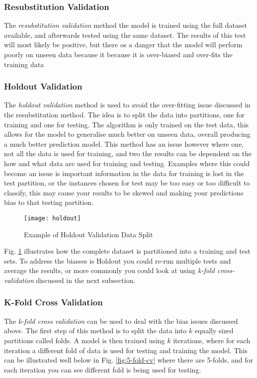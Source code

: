 \subsubsection{Resubstitution Validation}
The \textit{resubstitution validation} method the model is trained using the full dataset available, and afterwards tested using the same dataset. The results of this test will most likely be positive, but there os a danger that the model will perform poorly on unseen data because it because it is over-biased and over-fits the training data

\subsubsection{Holdout Validation}
The \textit{holdout validation} method is used to avoid the over-fitting issue discussed in the resubstitution method. The idea is to split the data into partitions, one for training and one for testing. The algorithm is only trained on the test data, this allows for the model to generalise much better on unseen data, overall producing a much better prediction model. This method has an issue however where one, not all the data is used for training, and two the results can be dependent on the how and what data are used for training and testing. Examples where this could become an issue is important information in the data for training is lost in the test partition, or the instances chosen for test may be too easy or too difficult to classify, this may cause your results to be skewed and making your predictions bias to that testing partition.

\begin{figure}[H]
	\texttt{[image: holdout]}
	\caption{Example of Holdout Validation Data Split}
	\label{fig:holdout}
\end{figure}

Fig. \ref{fig:holdout} illustrates how the complete dataset is partitioned into a training and test sets. To address the biasses is Holdout you could re-run multiple tests and average the results, or more commonly you could look at using \textit{k-fold cross-validation} discussed in the next subsection.

\subsubsection{K-Fold Cross Validation}\label{subsec:k_fold}
The \textit{k-fold cross validation} can be used to deal with the bias issues discussed above. The first step of this method is to split the data into $k$ equally sized partitions called folds. A model is then trained using $k$ iterations, where for each iteration a different fold of data is used for testing and training the model. This can be illustrated well below in Fig. \ref{fig:5-fold-cv} where there are 5-folds, and for each iteration you can see different fold is being used for testing.  

